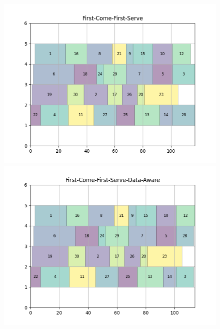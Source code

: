 \documentclass[a4paper]{article}
\begin{document}
\begin{figure}[ht] 
  \label{ fig7} 
  \begin{minipage}[b]{0.5\linewidth}
    \centering
    \includegraphics[width=1.11\linewidth]{MBSS/plot/Gantt_charts/First-Come-First-Serve.png} 
    \caption{} 
    \vspace{4ex}
  \end{minipage}%
  \begin{minipage}[b]{0.5\linewidth}
    \centering
    \includegraphics[width=1.11\linewidth]{MBSS/plot/Gantt_charts/First-Come-First-Serve-Data-Aware.png} 
    \caption{} 
    \vspace{4ex}
  \end{minipage} 

\end{figure}
\end{document}

